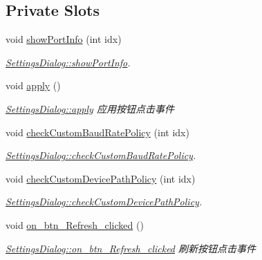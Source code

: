 \subsection*{Private Slots}
\begin{DoxyCompactItemize}
\item 
void \mbox{\hyperlink{class_settings_dialog_a70f6f67b5f5e3af21d011fa90c2b2098}{show\+Port\+Info}} (int idx)
\begin{DoxyCompactList}\small\item\em \mbox{\hyperlink{class_settings_dialog_a70f6f67b5f5e3af21d011fa90c2b2098}{Settings\+Dialog\+::show\+Port\+Info}}. \end{DoxyCompactList}\item 
void \mbox{\hyperlink{class_settings_dialog_aa0d7c1ec47555d438b86912af4830819}{apply}} ()
\begin{DoxyCompactList}\small\item\em \mbox{\hyperlink{class_settings_dialog_aa0d7c1ec47555d438b86912af4830819}{Settings\+Dialog\+::apply}} 应用按钮点击事件 \end{DoxyCompactList}\item 
void \mbox{\hyperlink{class_settings_dialog_aae0cd05c0c0204e11d9e4703ecf7b0a4}{check\+Custom\+Baud\+Rate\+Policy}} (int idx)
\begin{DoxyCompactList}\small\item\em \mbox{\hyperlink{class_settings_dialog_aae0cd05c0c0204e11d9e4703ecf7b0a4}{Settings\+Dialog\+::check\+Custom\+Baud\+Rate\+Policy}}. \end{DoxyCompactList}\item 
void \mbox{\hyperlink{class_settings_dialog_a5b561a34cba1fba972081978f3da0a4a}{check\+Custom\+Device\+Path\+Policy}} (int idx)
\begin{DoxyCompactList}\small\item\em \mbox{\hyperlink{class_settings_dialog_a5b561a34cba1fba972081978f3da0a4a}{Settings\+Dialog\+::check\+Custom\+Device\+Path\+Policy}}. \end{DoxyCompactList}\item 
void \mbox{\hyperlink{class_settings_dialog_a216e718d94b9766dbce166b37ebdc87b}{on\+\_\+btn\+\_\+\+Refresh\+\_\+clicked}} ()
\begin{DoxyCompactList}\small\item\em \mbox{\hyperlink{class_settings_dialog_a216e718d94b9766dbce166b37ebdc87b}{Settings\+Dialog\+::on\+\_\+btn\+\_\+\+Refresh\+\_\+clicked}} 刷新按钮点击事件 \end{DoxyCompactList}\end{DoxyCompactItemize}
